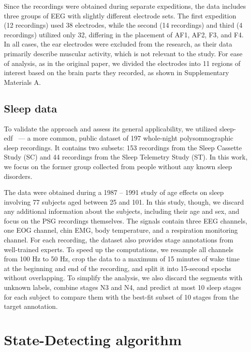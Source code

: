 \documentclass[journal,twoside,web]{ieeecolor2}
\begin{document}
Since the recordings were obtained during separate expeditions, the data includes three groups of EEG with slightly different electrode sets. The first expedition (12 recordings) used 38 electrodes, while the second (14 recordings) and third (4 recordings) utilized only 32, differing in the placement of AF1, AF2, F3, and F4. In all cases, the ear electrodes were excluded from the research, as their data primarily describe muscular activity, which is not relevant to the study. For ease of analysis, as in the original paper, we divided the electrodes into 11 regions of interest based on the brain parts they recorded, as shown in Supplementary Materials A.

\subsection{Sleep data}

To validate the approach and assess its general applicability, we utilized sleep-edf~\cite{SleepEdf,PhysioNet} --- a more common, public dataset of 197 whole-night polysomnographic sleep recordings. It contains two subsets: 153 recordings from the Sleep Cassette Study (SC) and 44 recordings from the Sleep Telemetry Study (ST). In this work, we focus on the former group collected from people without any known sleep disorders.

The data were obtained during a 1987 -- 1991 study of age effects on sleep involving 77 subjects aged between 25 and 101. In this study, though, we discard any additional information about the subjects, including their age and sex, and focus on the PSG recordings themselves. The signals contain three EEG channels, one EOG channel, chin EMG, body temperature, and a respiration monitoring channel. For each recording, the dataset also provides stage annotations from well-trained experts. To speed up the computations, we resample all channels from 100 Hz to 50 Hz, crop the data to a maximum of 15 minutes of wake time at the beginning and end of the recording, and split it into 15-second epochs without overlapping. To simplify the analysis, we also discard the segments with unknown labels, combine stages N3 and N4, and predict at most 10 sleep stages for each subject to compare them with the best-fit subset of 10 stages from the target annotation.

\section{State-Detecting algorithm}
\end{document}
